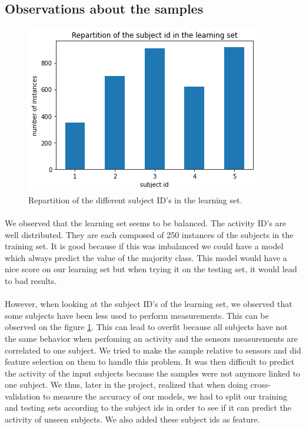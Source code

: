 \documentclass[a4paper, 11pt, oneside]{article}
\begin{document}
\subsection{Observations about the samples} \label{sec:obs}

\begin{figure}[H]
\center
\includegraphics[scale = 0.5]{preprocessing/subjects_repartition.png}
\caption{Repartition of the different subject ID's in the learning set.}
\label{subject_repartition}
\end{figure}

\paragraph{}We observed that the learning set seems to be balanced. The activity ID's are well distributed. They are each composed of 250 instances of the subjects in the training set. It is good because if this was imbalanced we could have a model which always predict the value of the majority class. This model would have a nice score on our learning set but when trying it on the testing set, it would lead to bad results. 

\paragraph{}However, when looking at the subject ID's of the learning set, we observed that some subjects have been less used to perform measurements. This can be observed on the figure \ref{subject_repartition}.
This can lead to overfit because all subjects have not the same behavior when perfoming an activity and the sensors measurements are correlated to one subject. We tried to make the sample relative to sensors and did feature selection on them to handle this problem. It was then difficult to predict the activity of the input subjects because the samples were not anymore linked to one subject. We thus, later in the project, realized that when doing cross-validation to measure the accuracy of our models, we had to split our training and testing sets according to the subject ids in order to see if it can predict the activity of unseen subjects.
We also added these subject ids as feature.
\end{document}
